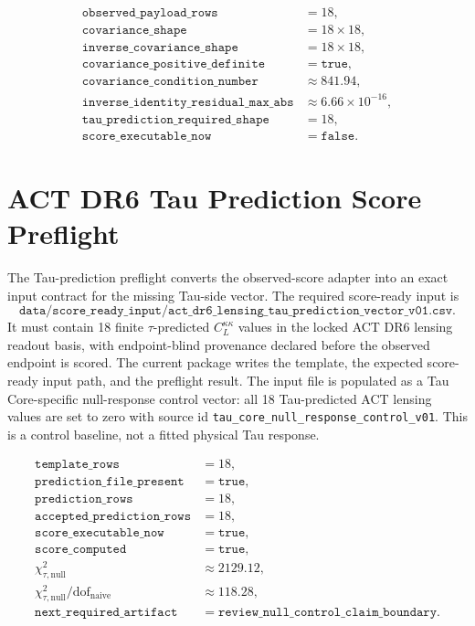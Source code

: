 \documentclass[11pt]{article}
\begin{document}
\[
\begin{array}{ll}
\texttt{observed\_payload\_rows} &= 18,\\
\texttt{covariance\_shape} &= 18\times18,\\
\texttt{inverse\_covariance\_shape} &= 18\times18,\\
\texttt{covariance\_positive\_definite} &= \texttt{true},\\
\texttt{covariance\_condition\_number} &\approx 841.94,\\
\texttt{inverse\_identity\_residual\_max\_abs} &\approx 6.66\times10^{-16},\\
\texttt{tau\_prediction\_required\_shape} &= 18,\\
\texttt{score\_executable\_now} &= \texttt{false}.
\end{array}
\]

\section{ACT DR6 Tau Prediction Score Preflight}

The Tau-prediction preflight converts the observed-score adapter into an exact
input contract for the missing Tau-side vector. The required score-ready input
is
\[
\texttt{data/score\_ready\_input/act\_dr6\_lensing\_tau\_prediction\_vector\_v01.csv}.
\]
It must contain 18 finite \(\tau\)-predicted \(C_L^{\kappa\kappa}\) values in
the locked ACT DR6 lensing readout basis, with endpoint-blind provenance
declared before the observed endpoint is scored. The current package writes the
template, the expected score-ready input path, and the preflight result. The
input file is populated as a Tau Core-specific null-response control vector:
all 18 Tau-predicted ACT lensing values are set to zero with source id
\texttt{tau\_core\_null\_response\_control\_v01}. This is a control baseline,
not a fitted physical Tau response.

\[
\begin{array}{ll}
\texttt{template\_rows} &= 18,\\
\texttt{prediction\_file\_present} &= \texttt{true},\\
\texttt{prediction\_rows} &= 18,\\
\texttt{accepted\_prediction\_rows} &= 18,\\
\texttt{score\_executable\_now} &= \texttt{true},\\
\texttt{score\_computed} &= \texttt{true},\\
\chi^2_{\tau,\mathrm{null}} &\approx 2129.12,\\
\chi^2_{\tau,\mathrm{null}}/\mathrm{dof}_{\mathrm{naive}} &\approx 118.28,\\
\texttt{next\_required\_artifact} &=
\texttt{review\_null\_control\_claim\_boundary}.
\end{array}
\]
\end{document}
